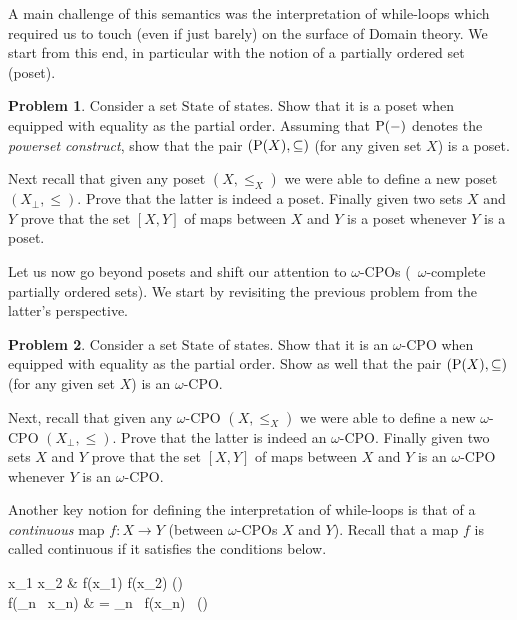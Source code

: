 \documentclass[a4paper, 11pt]{article}
\theoremstyle{definition}
\newtheorem{problem}{Problem}
\begin{document}
A main challenge of this semantics was the interpretation of while-loops which
required us to touch (even if just barely) on the surface of Domain theory.  We
start from this end, in particular with the notion of a partially ordered set
(poset).
\begin{problem}
        Consider a set $\mathrm{State}$ of states. Show that it is a poset when
        equipped with equality as the partial order. Assuming that $\mathrm{P}(-)$
        denotes the \emph{powerset construct}, show that the pair $(\mathrm{P}
        (X),\subseteq)$ (for any given set $X$) is a poset.

        Next recall that given any poset $(X, \leq_X)$ we were able to define a
        new poset $(X_\bot, \leq)$. Prove that the latter is indeed a
        poset.  Finally given two sets $X$ and $Y$ prove that the set $[X,Y]$
        of maps between $X$ and $Y$ is a poset whenever $Y$ is a poset.
\end{problem}

Let us now go beyond posets and shift our attention to $\omega$-CPOs (\ie\
$\omega$-complete partially ordered sets). We start by revisiting the previous
problem from the latter's perspective.

\begin{problem}
        Consider a set $\mathrm{State}$ of states. Show that it is an
        $\omega$-CPO when equipped with equality as the partial order.  Show as
        well that the pair $(\mathrm{P} (X),\subseteq)$ (for any given set $X$) is an
        $\omega$-CPO.

        Next, recall that given any $\omega$-CPO $(X, \leq_X)$ we were able to
        define a new $\omega$-CPO $(X_\bot, \leq)$. Prove that the latter is
        indeed an $\omega$-CPO.  Finally given two sets $X$ and $Y$ prove that
        the set $[X,Y]$ of maps between $X$ and $Y$ is an $\omega$-CPO whenever
        $Y$ is an $\omega$-CPO.
\end{problem}

Another key notion for defining the interpretation of while-loops is that of a
\emph{continuous} map $f : X \to Y$ (between $\omega$-CPOs $X$ and $Y$). Recall
that a map $f$ is called continuous if it satisfies the conditions below.
\begin{flalign*}
        x_1 \leq x_2  &  f(x_1) \leq f(x_2) \qquad ()
        \\
        f(\vee_{n \in \Nats} \, x_n) & = \vee_{n \in \Nats} \, f(x_n) \qquad \qquad \quad \> \, 
        (\text{for every monotone sequence $(x_n)_{n \in \Nats}$}) 
\end{flalign*}
\end{document}
